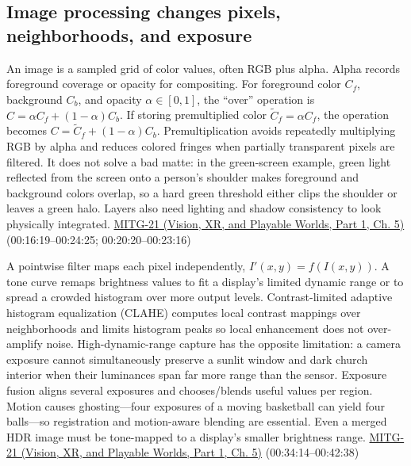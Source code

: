 \subsection{Image processing changes pixels, neighborhoods, and exposure}\label{03-visual-computing-i-ch004-image-processing-changes-pixels-neighborhoods-and-exposure}

\hypertarget{03-visual-computing-i-ch004-image-processing-changes-pixels-neighborhoods-and-exposure}{}

An image is a sampled grid of color values, often RGB plus alpha. Alpha records foreground coverage or opacity for compositing. For foreground color \(C_f\), background \(C_b\), and opacity \(\alpha\in[0,1]\), the ``over'' operation is \(C=\alpha C_f+(1-\alpha)C_b\). If storing premultiplied color \(\tilde C_f=\alpha C_f\), the operation becomes \(C=\tilde C_f+(1-\alpha)C_b\). Premultiplication avoids repeatedly multiplying RGB by alpha and reduces colored fringes when partially transparent pixels are filtered. It does not solve a bad matte: in the green-screen example, green light reflected from the screen onto a person's shoulder makes foreground and background colors overlap, so a hard green threshold either clips the shoulder or leaves a green halo. Layers also need lighting and shadow consistency to look physically integrated. \href{../07-Vision-XR-and-Playable-Worlds-P01/main.pdf\#nameddest=04-visual-computing-ii-ch036-mitg-21---image-processing}{MITG-21 (Vision, XR, and Playable Worlds, Part 1, Ch. 5)} (00:16:19--00:24:25; 00:20:20--00:23:16)

A pointwise filter maps each pixel independently, \(I'(x,y)=f(I(x,y))\). A tone curve remaps brightness values to fit a display's limited dynamic range or to spread a crowded histogram over more output levels. Contrast-limited adaptive histogram equalization (CLAHE) computes local contrast mappings over neighborhoods and limits histogram peaks so local enhancement does not over-amplify noise. High-dynamic-range capture has the opposite limitation: a camera exposure cannot simultaneously preserve a sunlit window and dark church interior when their luminances span far more range than the sensor. Exposure fusion aligns several exposures and chooses/blends useful values per region. Motion causes ghosting---four exposures of a moving basketball can yield four balls---so registration and motion-aware blending are essential. Even a merged HDR image must be tone-mapped to a display's smaller brightness range. \href{../07-Vision-XR-and-Playable-Worlds-P01/main.pdf\#nameddest=04-visual-computing-ii-ch036-mitg-21---image-processing}{MITG-21 (Vision, XR, and Playable Worlds, Part 1, Ch. 5)} (00:34:14--00:42:38)

